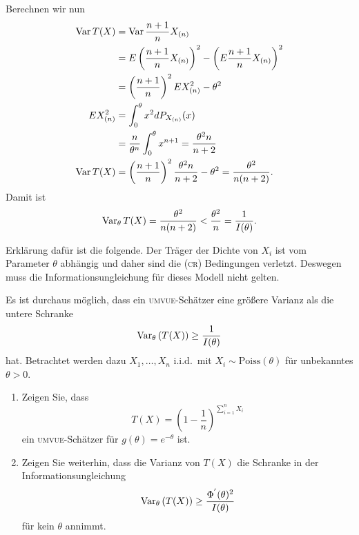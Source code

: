 Berechnen wir nun
\begin{align*}
    \operatorname{Var} T(X) &= \operatorname{Var} \frac{n+1}{n} X_{(n)} \\
    &= E\left( \frac{n+1}{n} X_{(n)} \right)^2 - \left( E \frac{n+1}{n} X_{(n)} \right)^2 \\
    &= \left( \frac{n+1}{n} \right)^2 E X_{(n)}^2 - \theta^2 \\
    E X_{(n)}^2 &= \int_{0}^{\theta} x^2 d P_{X_{(n)}}(x) \\
    &= \frac{n}{\theta^n} \int_{0}^{\theta} x^{n+1} = \frac{\theta^2 n}{n+2} \\
    \operatorname{Var} T(X) &= \left( \frac{n+1}{n} \right)^2 \frac{\theta^2 n }{n+2} - \theta^2 = \frac{\theta^2}{n(n+2)}.
\end{align*}
Damit ist 
\begin{equation*}
    \operatorname{Var}_\theta T(X) = \frac{\theta^2}{n(n+2)} < 
    \frac{\theta^2}{n} = \frac{1}{I(\theta)}.
\end{equation*}

Erklärung dafür ist die folgende. Der
Träger der Dichte von $X_i$ ist vom Parameter $\theta$ abhängig und daher sind
die \textsc{(cr)} Bedingungen verletzt.  Deswegen muss die
Informationsungleichung für dieses Modell nicht gelten. 







Es ist durchaus möglich, dass ein \textsc{umvue}-Schätzer eine größere Varianz als die untere
Schranke
\begin{equation*}
	\operatorname{Var}_\theta \left( T(X) \right) \geq \frac{1}{I(\theta)}
\end{equation*}
hat. Betrachtet werden dazu $X_1,\ldots,X_n$ i.i.d.\ mit $X_i \sim \textrm{Poiss}(\theta)$ für 
unbekanntes $\theta>0$. 
\begin{enumerate}
    \item Zeigen Sie, dass
\begin{equation*}
	T(X) = \left( 1- \frac{1}{n} \right)^{ \sum_{i=1}^{n} X_i}
\end{equation*}
ein \textsc{umvue}-Schätzer für $g(\theta)=e^{-\theta}$ ist.
    \item Zeigen Sie weiterhin, dass die
Varianz von $T(X)$ die Schranke in der Informationsungleichung
\begin{equation*}
	\operatorname{Var}_\theta\left( T(X) \right) \geq \frac{\Phi^{'}(\theta)^2}{I(\theta)}
\end{equation*}
für kein $\theta$ annimmt.
\end{enumerate}



